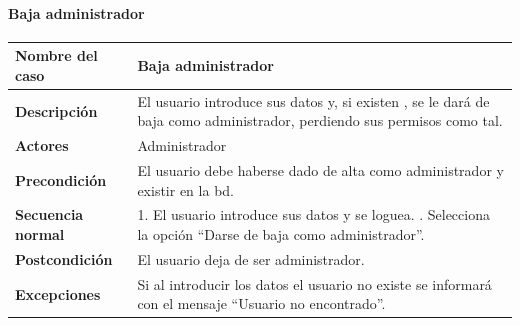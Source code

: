 \paragraph{Baja administrador}
\begin{table}[H]
    \centering
    \small
    \begin{tabularx}{0.8\textwidth}{|p{3.5cm}|X|}
        \hline
        \rowcolor{lightgray}
        \textbf{Nombre del caso}  & \textbf{Baja administrador}                                                                                            \\
        \hline
        \textbf{Descripción}      & El usuario introduce sus datos y, si existen , se le dará de baja como administrador, perdiendo sus permisos como tal. \\
        \hline
        \textbf{Actores}          & Administrador                                                                                                          \\
        \hline
        \textbf{Precondición}     & El usuario debe haberse dado de alta como administrador y existir en la \gls{bd}.                                      \\
        \hline
        \textbf{Secuencia normal} & 1. El usuario introduce sus datos y se loguea. \newline
        2. Selecciona la opción ``Darse de baja como administrador''.                                                                                      \\
        \hline
        \textbf{Postcondición}    & El usuario deja de ser administrador.                                                                                  \\
        \hline
        \textbf{Excepciones}      & Si al introducir los datos el usuario no existe se informará con el mensaje ``Usuario no encontrado''.                 \\
        \hline
    \end{tabularx}
\end{table}
